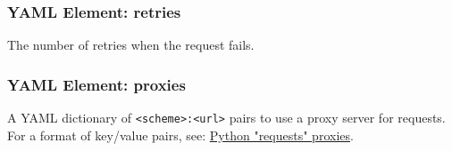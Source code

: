 \subsubsection{YAML Element: retries}\label{sec:yaml-generic-retries}
The number of retries when the request fails.


\subsubsection{YAML Element: proxies}\label{sec:yaml-generic-proxies}
A YAML dictionary of \texttt{<scheme>:<url>} pairs to use a proxy server for requests. 
For a format of key/value pairs, see: \href{https://requests.readthedocs.io/en/latest/user/advanced/\#proxies}{Python "requests" proxies}.


